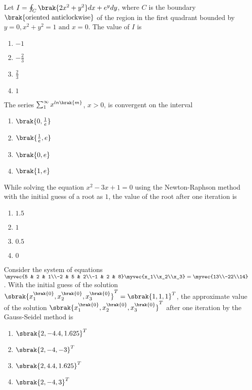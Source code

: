 \item Let $I = \oint_{C}\brak{2x^2 + y^2}dx + e^{y}dy$, where $C$ is the boundary $\brak{\text{oriented anticlockwise}}$ of the region in the first quadrant bounded by $y=0,x^2 + y^2 = 1 \text{ and } x=0$. The value of $I$ is
\hfill{}
\begin{enumerate}
\item $-1$
\item $-\frac{2}{3}$
\item $\frac{2}{3}$
\item $1$
\end{enumerate}

\item The series $\sum_{1}^{\infty} x^{ln\brak{m}}$, $x>0$, is convergent on the interval
\hfill{}
\begin{enumerate}
\item $\brak{0,\frac{1}{e}}$
\item $\brak{\frac{1}{e},e}$
\item $\brak{0,e}$
\item $\brak{1,e}$
\end{enumerate}

\item While solving the equation $x^2 - 3x + 1=0$ using the Newton-Raphson method with the initial guess of a root as $1$, the value of the root after one iteration is
\hfill{}
\begin{enumerate}
\item $1.5$
\item $1$
\item $0.5$
\item $0$
\end{enumerate}

\item Consider the system of equations
$\myvec{5 & 2 & 1\\-2 & 5 & 2\\-1 & 2 & 8}\myvec{x_1\\x_2\\x_3}=\myvec{13\\-22\\14}$.
With the initial guess of the solution $\sbrak{x_{1}^{\brak{0}},x_{2}^{\brak{0}},x_{3}^{\brak{0}}}^{T} = \sbrak{1,1,1}^{T}$, the approximate value of the solution $\sbrak{x_{1}^{\brak{0}},x_{2}^{\brak{0}},x_{3}^{\brak{0}}}^{T}$ after one iteration by the Gauss-Seidel method is
\hfill{}
\begin{enumerate}
\item $\sbrak{2,-4.4,1.625}^{T}$
\item $\sbrak{2,-4,-3}^{T}$
\item $\sbrak{2,4.4,1.625}^{T}$
\item $\sbrak{2,-4,3}^{T}$
\end{enumerate}

